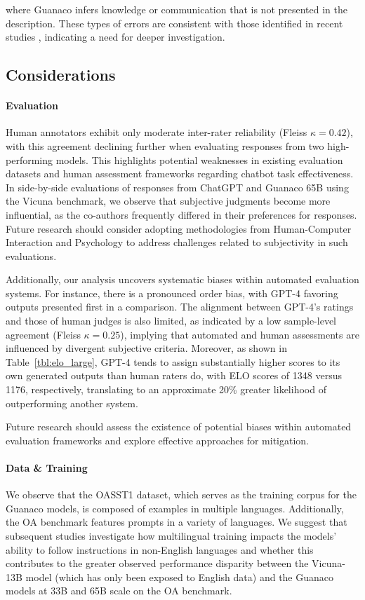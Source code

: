 where {Guanaco} infers knowledge or communication that is not presented in the description. These types of errors are consistent with those identified in recent studies \cite{sap2022neural}, indicating a need for deeper investigation.

\subsection{Considerations}
\label{ssec:considerations}

\paragraph{Evaluation}

Human annotators exhibit only moderate inter-rater reliability (Fleiss $\kappa=0.42$), with this agreement declining further when evaluating responses from two high-performing models. This highlights potential weaknesses in existing evaluation datasets and human assessment frameworks regarding chatbot task effectiveness. In side-by-side evaluations of responses from ChatGPT and {Guanaco} 65B using the Vicuna benchmark, we observe that subjective judgments become more influential, as the co-authors frequently differed in their preferences for responses. Future research should consider adopting methodologies from Human-Computer Interaction and Psychology to address challenges related to subjectivity in such evaluations.

Additionally, our analysis uncovers systematic biases within automated evaluation systems. For instance, there is a pronounced order bias, with GPT-4 favoring outputs presented first in a comparison. The alignment between GPT-4's ratings and those of human judges is also limited, as indicated by a low sample-level agreement (Fleiss $\kappa=0.25$), implying that automated and human assessments are influenced by divergent subjective criteria. Moreover, as shown in Table~\ref{tbl:elo_large}, GPT-4 tends to assign substantially higher scores to its own generated outputs than human raters do, with ELO scores of 1348 versus 1176, respectively, translating to an approximate 20\% greater likelihood of outperforming another system.

Future research should assess the existence of potential biases within automated evaluation frameworks and explore effective approaches for mitigation.

\paragraph{Data \& Training} We observe that the OASST1 dataset, which serves as the training corpus for the {Guanaco} models, is composed of examples in multiple languages. Additionally, the OA benchmark features prompts in a variety of languages. We suggest that subsequent studies investigate how multilingual training impacts the models' ability to follow instructions in non-English languages and whether this contributes to the greater observed performance disparity between the Vicuna-13B model (which has only been exposed to English data) and the {Guanaco} models at 33B and 65B scale on the OA benchmark.

